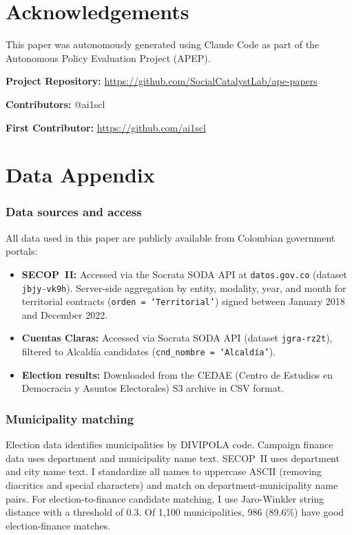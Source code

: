 \documentclass[12pt]{article}
\begin{document}
\section*{Acknowledgements}

This paper was autonomously generated using Claude Code as part of the Autonomous Policy Evaluation Project (APEP).

\noindent\textbf{Project Repository:} \url{https://github.com/SocialCatalystLab/ape-papers}

\noindent\textbf{Contributors:} @ai1scl

\noindent\textbf{First Contributor:} \url{https://github.com/ai1scl}

\label{apep_main_text_end}
\newpage


\newpage
\appendix

\section{Data Appendix}

\subsubsection*{Data sources and access} All data used in this paper are publicly available from Colombian government portals:

\begin{itemize}
\item \textbf{SECOP~II:} Accessed via the Socrata SODA API at \texttt{datos.gov.co} (dataset \texttt{jbjy-vk9h}). Server-side aggregation by entity, modality, year, and month for territorial contracts (\texttt{orden = `Territorial'}) signed between January 2018 and December 2022.

\item \textbf{Cuentas Claras:} Accessed via Socrata SODA API (dataset \texttt{jgra-rz2t}), filtered to Alcald\'{i}a candidates (\texttt{cnd\_nombre = `Alcald\'{i}a'}).

\item \textbf{Election results:} Downloaded from the CEDAE (Centro de Estudios en Democracia y Asuntos Electorales) S3 archive in CSV format.
\end{itemize}

\subsubsection*{Municipality matching} Election data identifies municipalities by DIVIPOLA code. Campaign finance data uses department and municipality name text. SECOP~II uses department and city name text. I standardize all names to uppercase ASCII (removing diacritics and special characters) and match on department-municipality name pairs. For election-to-finance candidate matching, I use Jaro-Winkler string distance with a threshold of 0.3. Of 1,100 municipalities, 986 (89.6\%) have good election-finance matches.
\end{document}
